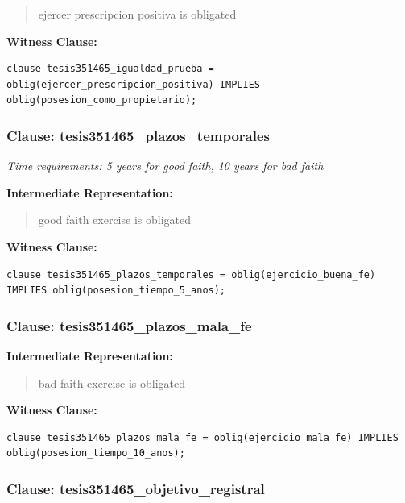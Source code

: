 \documentclass[11pt,a4paper]{article}
\begin{document}
\begin{quote}
ejercer prescripcion positiva is obligated
\end{quote}

\textbf{Witness Clause:}

\begin{lstlisting}[style=witnessstyle, language=Witness]
clause tesis351465_igualdad_prueba = oblig(ejercer_prescripcion_positiva) IMPLIES oblig(posesion_como_propietario);
\end{lstlisting}

\subsubsection{Clause: tesis351465\_plazos\_temporales}

\textit{Time requirements: 5 years for good faith, 10 years for bad faith}

\textbf{Intermediate Representation:}

\begin{quote}
good faith exercise is obligated
\end{quote}

\textbf{Witness Clause:}

\begin{lstlisting}[style=witnessstyle, language=Witness]
clause tesis351465_plazos_temporales = oblig(ejercicio_buena_fe) IMPLIES oblig(posesion_tiempo_5_anos);
\end{lstlisting}

\subsubsection{Clause: tesis351465\_plazos\_mala\_fe}

\textbf{Intermediate Representation:}

\begin{quote}
bad faith exercise is obligated
\end{quote}

\textbf{Witness Clause:}

\begin{lstlisting}[style=witnessstyle, language=Witness]
clause tesis351465_plazos_mala_fe = oblig(ejercicio_mala_fe) IMPLIES oblig(posesion_tiempo_10_anos);
\end{lstlisting}

\subsubsection{Clause: tesis351465\_objetivo\_registral}
\end{document}
